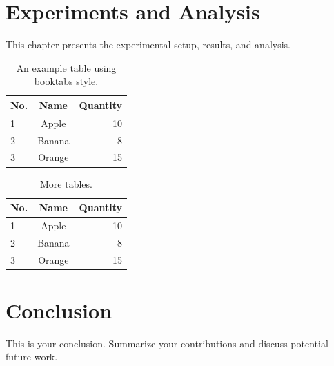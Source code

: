 \documentclass[12pt, a4paper]{report}
\begin{document}
\chapter{Experiments and Analysis}
\label{chap:exps}

This chapter presents the experimental setup, results, and analysis.

\begin{table}[htbp]
    \centering
    \caption{An example table using booktabs style.}
    \label{tab:example}
    \begin{tabular}{@{}lcr@{}}
        \toprule
        No. & Name   & Quantity \\
        \midrule
        1   & Apple  & 10       \\
        2   & Banana & 8        \\
        3   & Orange & 15       \\
        \bottomrule
    \end{tabular}
\end{table}

\begin{table}[htbp]
    \centering
    \caption{More tables.}
    \label{tab:example}
    \begin{tabular}{@{}lcr@{}}
        \toprule
        No. & Name   & Quantity \\
        \midrule
        1   & Apple  & 10       \\
        2   & Banana & 8        \\
        3   & Orange & 15       \\
        \bottomrule
    \end{tabular}
\end{table}

\chapter{Conclusion}
\label{chap:conclusion}

This is your conclusion. Summarize your contributions and discuss potential
future work.

\backmatter



\end{document}
